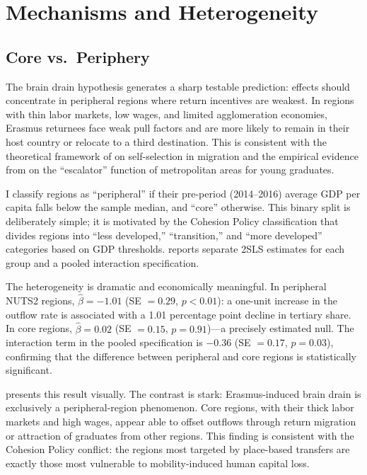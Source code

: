 \documentclass[12pt]{article}
\begin{document}
\section{Mechanisms and Heterogeneity}
\label{sec:mechanisms}

\subsection{Core vs.\ Periphery}

The brain drain hypothesis generates a sharp testable prediction: effects should concentrate in peripheral regions where return incentives are weakest. In regions with thin labor markets, low wages, and limited agglomeration economies, Erasmus returnees face weak pull factors and are more likely to remain in their host country or relocate to a third destination. This is consistent with the theoretical framework of \citet{borjas_1995} on self-selection in migration and the empirical evidence from \citet{faggian_mccann_2009} on the ``escalator'' function of metropolitan areas for young graduates.

I classify regions as ``peripheral'' if their pre-period (2014--2016) average GDP per capita falls below the sample median, and ``core'' otherwise. This binary split is deliberately simple; it is motivated by the Cohesion Policy classification that divides regions into ``less developed,'' ``transition,'' and ``more developed'' categories based on GDP thresholds.  reports separate 2SLS estimates for each group and a pooled interaction specification.



The heterogeneity is dramatic and economically meaningful. In peripheral NUTS2 regions, $\hat{\beta} = -1.01$ (SE $= 0.29$, $p < 0.01$): a one-unit increase in the outflow rate is associated with a 1.01 percentage point decline in tertiary share. In core regions, $\hat{\beta} = 0.02$ (SE $= 0.15$, $p = 0.91$)---a precisely estimated null. The interaction term in the pooled specification is $-0.36$ (SE $= 0.17$, $p = 0.03$), confirming that the difference between peripheral and core regions is statistically significant.

 presents this result visually. The contrast is stark: Erasmus-induced brain drain is exclusively a peripheral-region phenomenon. Core regions, with their thick labor markets and high wages, appear able to offset outflows through return migration or attraction of graduates from other regions. This finding is consistent with the Cohesion Policy conflict: the regions most targeted by place-based transfers are exactly those most vulnerable to mobility-induced human capital loss.
\end{document}
